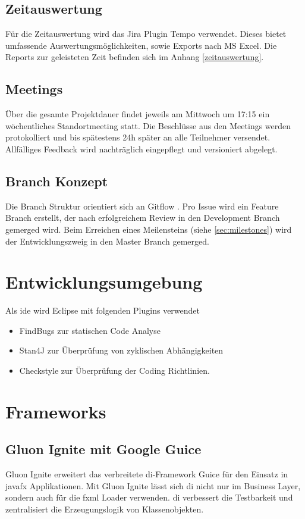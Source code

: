 \documentclass[11pt,a4paper,english,oneside]{book}
\numberwithin{equation}{chapter}
\begin{document}
	\subsection{Zeitauswertung}
	Für die Zeitauswertung wird das Jira Plugin Tempo \cite{jiratempo} verwendet. Dieses bietet umfassende Auswertungsmöglichkeiten, sowie Exports nach MS Excel. Die Reports zur geleisteten Zeit befinden sich im Anhang \ref{zeitauswertung}.
	
	\subsection{Meetings} \label{ssec:meeting}
	Über die gesamte Projektdauer findet jeweils am Mittwoch um 17:15 ein wöchentliches Standortmeeting statt. Die Beschlüsse aus den Meetings werden protokolliert und bis spätestens 24h später an alle Teilnehmer versendet. Allfälliges Feedback wird nachträglich eingepflegt und versioniert abgelegt.
	
	\subsection{Branch Konzept}
	Die Branch Struktur orientiert sich an Gitflow \cite{gitflow}. Pro Issue wird ein Feature Branch erstellt, der nach erfolgreichem Review in den Development Branch gemerged wird. Beim Erreichen eines Meilensteins (siehe \ref{sec:milestones}) wird der Entwicklungszweig in den Master Branch gemerged.
	
	\section{Entwicklungsumgebung}
	Als \gls{ide} wird Eclipse mit folgenden Plugins verwendet
	\begin{itemize}
		\item FindBugs \cite{findbugs} zur statischen Code Analyse
		\item Stan4J \cite{stan4j} zur Überprüfung von zyklischen Abhängigkeiten
		\item Checkstyle \cite{checkstyle} zur Überprüfung der Coding Richtlinien.
	\end{itemize}

	\section{Frameworks}
	
	\subsection{Gluon Ignite mit Google Guice}
	Gluon Ignite \cite{gluonignite} erweitert das verbreitete \gls{di}-Framework Guice \cite{guice} für den Einsatz in \gls{javafx} Applikationen. Mit Gluon Ignite lässt sich \gls{di} nicht nur im Business Layer, sondern auch für die \gls{fxml} Loader verwenden. \gls{di} verbessert die Testbarkeit und zentralisiert die Erzeugungslogik von Klassenobjekten.
\end{document}
